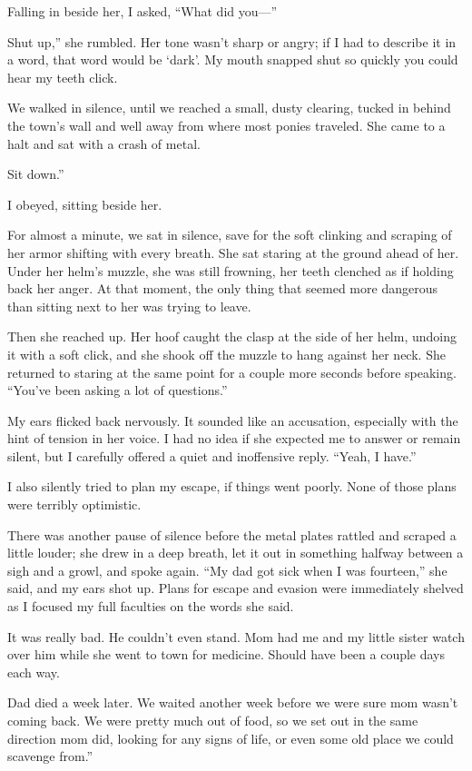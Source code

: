 Falling in beside her, I asked, “What did you—”

\leavevmode{}Shut up,” she rumbled. Her tone wasn’t sharp or angry; if I had to describe it in a word, that word would be ‘dark’. My mouth snapped shut so quickly you could hear my teeth click.

We walked in silence, until we reached a small, dusty clearing, tucked in behind the town’s wall and well away from where most ponies traveled. She came to a halt and sat with a crash of metal.

\leavevmode{}Sit down.”

I obeyed, sitting beside her.

For almost a minute, we sat in silence, save for the soft clinking and scraping of her armor shifting with every breath. She sat staring at the ground ahead of her. Under her helm’s muzzle, she was still frowning, her teeth clenched as if holding back her anger. At that moment, the only thing that seemed more dangerous than sitting next to her was trying to leave.

Then she reached up. Her hoof caught the clasp at the side of her helm, undoing it with a soft click, and she shook off the muzzle to hang against her neck. She returned to staring at the same point for a couple more seconds before speaking. “You’ve been asking a lot of questions.”

My ears flicked back nervously. It sounded like an accusation, especially with the hint of tension in her voice. I had no idea if she expected me to answer or remain silent, but I carefully offered a quiet and inoffensive reply. “Yeah, I have.”

I also silently tried to plan my escape, if things went poorly. None of those plans were terribly optimistic.

There was another pause of silence before the metal plates rattled and scraped a little louder; she drew in a deep breath, let it out in something halfway between a sigh and a growl, and spoke again. “My dad got sick when I was fourteen,” she said, and my ears shot up. Plans for escape and evasion were immediately shelved as I focused my full faculties on the words she said.

\leavevmode{}It was really bad. He couldn’t even stand. Mom had me and my little sister watch over him while she went to town for medicine. Should have been a couple days each way.

\leavevmode{}Dad died a week later. We waited another week before we were sure mom wasn’t coming back. We were pretty much out of food, so we set out in the same direction mom did, looking for any signs of life, or even some old place we could scavenge from.”

